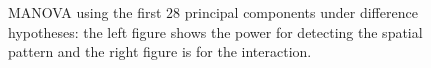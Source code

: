 \documentclass[english]{article}\usepackage[]{graphicx}\usepackage[]{color}
\begin{document}
\begin{figure}[H]
\begin{centering}
\par\end{centering}

\centering{}\protect\caption{MANOVA using the first $28$ principal components under difference
hypotheses: the left figure shows the power for detecting the spatial
pattern and the right figure is for the interaction.\label{fig:MANOVA-ss}}
\end{figure}
\end{document}
